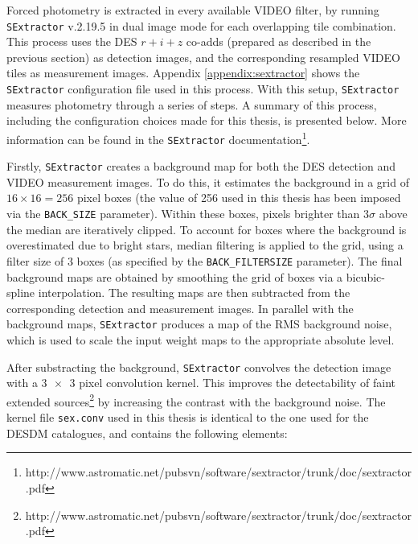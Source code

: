 Forced photometry is extracted in every available VIDEO filter, by running \texttt{SExtractor} v.2.19.5 \citep{1996A&AS..117..393B} in dual image mode for each overlapping \DESVIDEO tile combination. This process uses the DES $r+i+z$ co-adds (prepared as described in the previous section) as detection images, and the corresponding resampled VIDEO tiles as measurement images. Appendix \ref{appendix:sextractor} shows the \texttt{SExtractor} configuration file used in this process. With this setup, \texttt{SExtractor} measures photometry through a series of steps. A summary of this process, including the configuration choices made for this thesis, is presented below. More information can be found in the \texttt{SExtractor} documentation\footnote{\color{blue} http://www.astromatic.net/pubsvn/software/sextractor/trunk/doc/sextractor.pdf}. \par

Firstly, \texttt{SExtractor} creates a background map for both the DES detection and VIDEO measurement images. To do this, it estimates the background in a grid of $16 \times 16 = 256$ pixel boxes (the value of 256 used in this thesis has been imposed via the \texttt{BACK\_SIZE} parameter). Within these boxes, pixels brighter than $3\sigma$ above the median are iteratively clipped. To account for boxes where the background is overestimated due to bright stars, median filtering is applied to the grid, using a filter size of 3 boxes (as specified by the \texttt{BACK\_FILTERSIZE} parameter). The final background maps are obtained by smoothing the grid of boxes via a bicubic-spline interpolation. The resulting maps are then subtracted from the corresponding detection and measurement images. In parallel with the background maps, \texttt{SExtractor} produces a map of the RMS background noise, which is used to scale the input weight maps to the appropriate absolute level. \par 





After substracting the background, \texttt{SExtractor} convolves the detection image  with a $\num{3 x 3}$ pixel convolution kernel. This improves the detectability of faint extended sources\footnote{\color{blue} http://www.astromatic.net/pubsvn/software/sextractor/trunk/doc/sextractor.pdf} by increasing the contrast with the background noise. The kernel file \texttt{sex.conv} used in this thesis is identical to the one used for the DESDM catalogues, and contains the following elements: 

